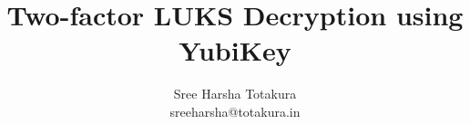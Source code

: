 \documentclass{beamer}
\title{Two-factor LUKS Decryption using YubiKey}
\author{Sree Harsha Totakura \\ {\footnotesize sreeharsha@totakura.in}}
\begin{document}
\begin{frame}
  \maketitle
\end{frame}
\end{document}
